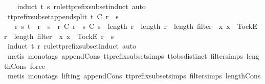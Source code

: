\begin{isabellebody}
%
\isadelimproof
\ \ %
\endisadelimproof
%
\isatagproof
{}\isamarkupfalse%
\ {\isacharparenleft}induct\ t\ s\ rule{\isacharcolon}tt{\isacharunderscore}prefix{\isacharunderscore}subset{\isachardot}induct{\isacharcomma}\ auto{\isacharparenright}%
\endisatagproof
{\isafoldproof}%
%
\isadelimproof
\isanewline
%
\endisadelimproof
\isanewline
{}\isamarkupfalse%
\ tt{\isacharunderscore}prefix{\isacharunderscore}subset{\isacharunderscore}append{\isacharunderscore}split{\isacharcolon}\ {\isachardoublequoteopen}t\ {\isasymlesssim}\isactrlsub C\ r\ {\isacharat}\ s\ {\isasymLongrightarrow}\isanewline
\ \ {\isasymexists}\ r{\isacharprime}\ s{\isacharprime}{\isachardot}\ t\ {\isacharequal}\ r{\isacharprime}\ {\isacharat}\ s{\isacharprime}\ {\isasymand}\ r{\isacharprime}\ {\isasymlesssim}\isactrlsub C\ r\ {\isasymand}\ s{\isacharprime}\ {\isasymlesssim}\isactrlsub C\ s\ {\isasymand}\ {\isacharparenleft}{\isacharparenleft}length\ r{\isacharprime}\ {\isacharequal}\ length\ r\ {\isasymand}\ length\ {\isacharparenleft}filter\ {\isacharparenleft}{\isasymlambda}\ x{\isachardot}\ x\ {\isacharequal}\ {\isacharbrackleft}Tock{\isacharbrackright}\isactrlsub E{\isacharparenright}\ r{\isacharprime}{\isacharparenright}\ {\isacharequal}\ length\ {\isacharparenleft}filter\ {\isacharparenleft}{\isasymlambda}\ x{\isachardot}\ x\ {\isacharequal}\ {\isacharbrackleft}Tock{\isacharbrackright}\isactrlsub E{\isacharparenright}\ r{\isacharparenright}{\isacharparenright}\ {\isasymor}\ s{\isacharprime}\ {\isacharequal}\ {\isacharbrackleft}{\isacharbrackright}{\isacharparenright}{\isachardoublequoteclose}\isanewline
%
\isadelimproof
\ \ %
\endisadelimproof
%
\isatagproof
{}\isamarkupfalse%
\ {\isacharparenleft}induct\ t\ {\isachardoublequoteopen}r{\isachardoublequoteclose}\ rule{\isacharcolon}tt{\isacharunderscore}prefix{\isacharunderscore}subset{\isachardot}induct{\isacharcomma}\ auto{\isacharparenright}\isanewline
\ \ \isamarkupfalse%
\ {\isacharparenleft}metis\ {\isacharparenleft}mono{\isacharunderscore}tags{\isacharparenright}\ append{\isacharunderscore}Cons\ tt{\isacharunderscore}prefix{\isacharunderscore}subset{\isachardot}simps{\isacharparenleft}{}{\isacharparenright}\ ttobs{\isachardot}distinct{\isacharparenleft}{}{\isacharparenright}\ filter{\isachardot}simps{\isacharparenleft}{}{\isacharparenright}\ length{\isacharunderscore}Cons{\isacharcomma}\ force{\isacharparenright}\isanewline
\ \ \isamarkupfalse%
\ {\isacharparenleft}metis\ {\isacharparenleft}mono{\isacharunderscore}tags{\isacharcomma}\ lifting{\isacharparenright}\ append{\isacharunderscore}Cons\ tt{\isacharunderscore}prefix{\isacharunderscore}subset{\isachardot}simps{\isacharparenleft}{}{\isacharparenright}\ filter{\isachardot}simps{\isacharparenleft}{}{\isacharparenright}\ length{\isacharunderscore}Cons{\isacharparenright}\isanewline

\end{isabellebody}
